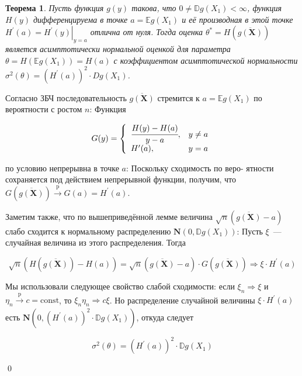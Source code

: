 \documentclass[oneside,final,14pt]{extreport}
\renewenvironment{proof}{{\bfseries Доказательство.}}{\qed}
\newtheorem{thm}{Теорема}[section]
\theoremstyle{definition}
\begin{document}
\begin{thm}
Пусть функция $g(y)$ такова, что $0 \neq \mathbb{D} g\left(X_{1}\right)<\infty$, функция $H(y)$ дифференцируема в точке $a=\mathbb{E} g\left(X_{1}\right)$ и её производная в этой точке $H^{\prime}(a)=\left.H^{\prime}(y)\right|_{y=a}$ отлична от нуля. Тогда оценка $\theta^{*}=H(\overline{g(\mathbf{X})})$
является асимптотически нормальной
оценкой для параметра $\theta=H\left(\mathbb{E} g\left(X_{1}\right)\right)=H(a)$ с коэффициентом асимптотической нормальности $\sigma^{2}(\theta)=\left(H^{\prime}(a)\right)^{2} \cdot D g\left(X_{1}\right)$.
\end{thm}

\begin{proof}
Согласно ЗБЧ последовательность $\overline{g(\mathbf{X})}$ стремится к $a=\mathbb{E} g\left(X_{1}\right)$ по вероятности с ростом $n$: Функция

\begin{equation*}
    G(y)=\left\{\begin{array}{ll}
    \cfrac{H(y)-H(a)}{y-a}, & y \neq a \\
    H^{\prime}(a), & y=a
    \end{array}\right.  
\end{equation*}

по условию непрерывна в точке $a$: Поскольку сходимость по веро-
ятности сохраняется под действием непрерывной функции, получим,
что $G(\overline{g(\mathbf{X})}) \xrightarrow[]{\mathrm{p}} G(a)=H^{\prime}(a)$.

Заметим также, что по вышеприведённой лемме величина $\sqrt{n}(\overline{g(\mathbf{X})}-a)$ слабо сходится
к нормальному распределению $\mathbf{N}(0, \mathbb{D} g(X_{1}))$: Пусть $\xi$~--- случайная величина
из этого распределения. Тогда

\begin{equation*}
    \sqrt{n}(H(\overline{g(\mathbf{X})})-H(a))=\sqrt{n}(\overline{g(\mathbf{X})}-a) \cdot G(\overline{g(\mathbf{X})}) \Rightarrow \xi \cdot H^{\prime}(a)
\end{equation*}

Мы использовали следующее свойство слабой сходимости: если $\xi_{n} \Rightarrow \xi$ и $\eta_{n} \xrightarrow[]{\mathrm{p}} c=\mathrm{const}$, то $\xi_{n} \eta_{n} \Rightarrow c \xi$. Но распределение случайной величины $\xi \cdot H^{\prime}(a)$ есть $\mathbf{N}(0,(H^{\prime}(a))^{2} \cdot \mathbb{D} g(X_{1}))$, откуда следует

\begin{equation*}
    \sigma^{2}(\theta)=\left(H^{\prime}(a)\right)^{2} \cdot \mathbb{D} g\left(X_{1}\right)
\end{equation*}

\end{proof}
\end{document}
